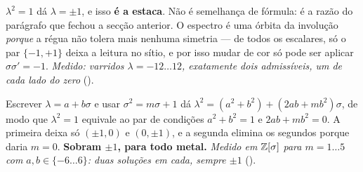 \documentclass[livro.tex]{subfiles}
\begin{document}
\begin{obs}
$\lambda^{2}=1$ dá $\lambda=\pm1$, e isso \textbf{é a estaca}. Não é semelhança de fórmula: é a razão
do parágrafo que fechou a secção anterior. O espectro é uma órbita da involução \emph{porque} a régua
não tolera mais nenhuma simetria --- de todos os escalares, só o par $\{-1,+1\}$ deixa a leitura no
sítio, e por isso mudar de cor só pode ser aplicar $\sigma\sigma'=-1$. \emph{Medido: varridos
$\lambda=-12\ldots12$, exatamente dois admissíveis, um de cada lado do zero} ().
\end{obs}

\begin{obs}
Escrever $\lambda=a+b\sigma$ e usar $\sigma^{2}=m\sigma+1$ dá
$\lambda^{2}=(a^{2}+b^{2})+(2ab+mb^{2})\sigma$, de modo que $\lambda^{2}=1$ equivale ao par de
condições $a^{2}+b^{2}=1$ e $2ab+mb^{2}=0$. A primeira deixa só $(\pm1,0)$ e $(0,\pm1)$, e a segunda
elimina os segundos porque daria $m=0$. \textbf{Sobram $\pm1$, para todo metal.} \emph{Medido em
$\mathbb Z[\sigma]$ para $m=1\ldots5$ com $a,b\in\{-6\ldots6\}$: duas soluções em cada, sempre $\pm1$}
().
\end{obs}
\end{document}
